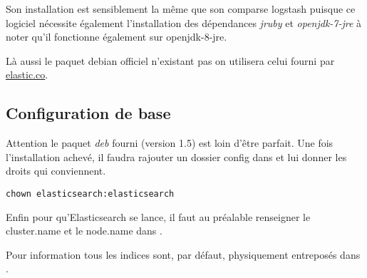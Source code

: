 Son installation est sensiblement la même que son comparse logstash puisque ce logiciel 
nécessite également l'installation des dépendances \emph{jruby} et \emph{openjdk-7-jre}
à noter qu'il fonctionne également sur openjdk-8-jre.

Là aussi le paquet debian officiel n'existant pas on utilisera celui fourni par 
\hyperref[https://download.elastic.co/elasticsearch/elasticsearch/elasticsearch-1.5.1.deb]{elastic.co}.

\subsection{Configuration de base}
Attention le paquet \textit{deb} fourni (version 1.5) est loin d'être parfait.
Une fois l'installation achevé, il faudra rajouter un dossier config
dans  et lui donner les droits qui conviennent.
\begin{lstlisting}[style=code,label={lst:ajoutdepotconfigchown}]
chown elasticsearch:elasticsearch
\end{lstlisting}

Enfin pour qu'Elasticsearch se lance, il faut au préalable renseigner le cluster.name
et le node.name dans .

Pour information tous les indices sont, par défaut, physiquement entreposés dans\\
.






